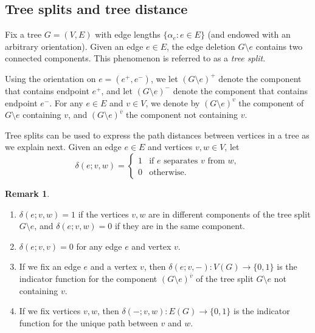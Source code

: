 \documentclass[12pt]{amsart}
\theoremstyle{definition}
\newtheorem{rmk}[thm]{Remark}
\begin{document}
\subsection{Tree splits and tree distance}
\label{sec:tree-splits}


Fix a tree $G = (V,E)$ with edge lengths $\{ \alpha_e \colon e \in E\}$ (and endowed with an arbitrary orientation). Given an edge $e \in E$, the edge deletion $G \setminus e$ contains two connected components. This phenomenon is referred to as a {\em tree split}.

Using the orientation on $e = (e^+,e^-)$,
we let $(G \setminus e)^+$ denote the component that contains endpoint $e^+$, and let $(G\setminus e)^-$ denote the component that contains endpoint $e^-$.
For any $e \in E$ and $v \in V$, we denote by $(G \setminus e)^{v}$ the component of $G\setminus e$ containing $v$, and $(G\setminus e)^{\overline v}$ the component not containing $v$.

Tree splits can be used to express the path distances between vertices in a tree as we explain next.
Given an edge $e\in E$ and vertices $v,w \in V$, let 
\begin{equation}
\delta(e;v,w) = \begin{cases}
	1 &\text{if $e$ separates  $v$ from $w$}, \\
	0 &\text{otherwise}.
\end{cases}
\end{equation}

\begin{rmk}\label{rmk:delta properties}
\hfill
\begin{enumerate}[label=(\roman*)]
\item $\delta(e; v,w) = 1$ if the vertices $v, w$ are in different components of the tree split $G \setminus e$, and $\delta(e; v,w) = 0$ if they are in the same component.
\item $\delta(e; v,v) = 0$ for any edge $e$ and vertex $v$.
\item If we fix an edge $e$ and a vertex $v$,
then $\delta(e;v, -) \colon V(G) \to \{0,1\}$ 
is the indicator function for the component 
$(G \setminus e)^{\overline v}$ of the tree split $G \setminus e$ not containing $v$.
\item If we fix vertices $v, w$, then $\delta(-;v,w) \colon E(G) \to \{0,1\}$
is the indicator function for the unique path between $v$ and $w$.
\end{enumerate}
\end{rmk}
\end{document}

